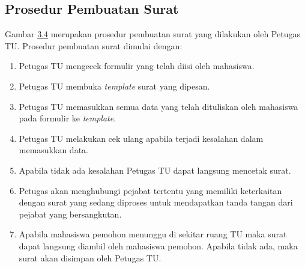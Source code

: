 \subsection{Prosedur Pembuatan Surat}
\label{sec:prosedur_pembuatan_surat}
Gambar \hyperlink{pembuatan_terkini}{3.4} merupakan prosedur pembuatan surat yang dilakukan oleh Petugas TU. Prosedur pembuatan surat dimulai dengan:
\begin{enumerate}
	\item Petugas TU mengecek formulir yang telah diisi oleh mahasiswa.
	\item Petugas TU membuka \textit{template} surat yang dipesan.
	\item Petugas TU memasukkan semua data yang telah dituliskan oleh mahasiswa pada formulir ke \textit{template}.
	\item Petugas TU melakukan cek ulang apabila terjadi kesalahan dalam memasukkan data.
	\item Apabila tidak ada kesalahan Petugas TU dapat langsung mencetak surat.
	\item Petugas akan menghubungi pejabat tertentu yang memiliki keterkaitan dengan surat yang sedang diproses untuk mendapatkan tanda tangan dari pejabat yang bersangkutan.
	\item Apabila mahasiswa pemohon menunggu di sekitar ruang TU maka surat dapat langsung diambil oleh mahasiswa pemohon. Apabila tidak ada, maka surat akan disimpan oleh Petugas TU.
\end{enumerate}

